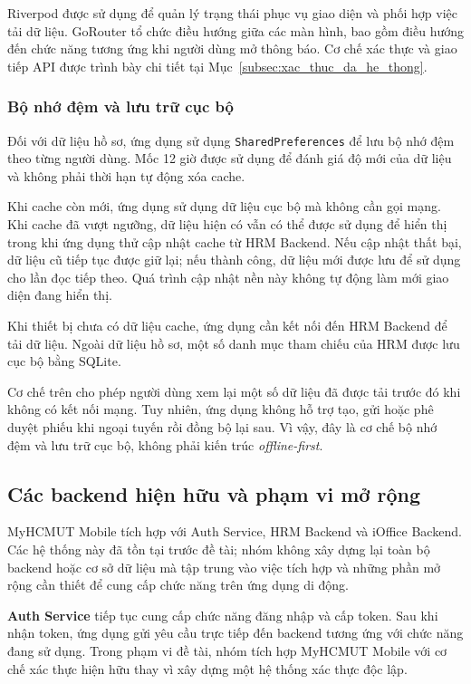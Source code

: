 Riverpod được sử dụng để quản lý trạng thái phục vụ giao diện và phối hợp việc tải dữ liệu. GoRouter tổ chức điều hướng giữa các màn hình, bao gồm điều hướng đến chức năng tương ứng khi người dùng mở thông báo. Cơ chế xác thực và giao tiếp API được trình bày chi tiết tại Mục~\ref{subsec:xac_thuc_da_he_thong}.

\subsubsection*{Bộ nhớ đệm và lưu trữ cục bộ}

Đối với dữ liệu hồ sơ, ứng dụng sử dụng \texttt{SharedPreferences} để lưu bộ nhớ đệm theo từng người dùng. Mốc 12 giờ được sử dụng để đánh giá độ mới của dữ liệu và không phải thời hạn tự động xóa cache.

Khi cache còn mới, ứng dụng sử dụng dữ liệu cục bộ mà không cần gọi mạng. Khi cache đã vượt ngưỡng, dữ liệu hiện có vẫn có thể được sử dụng để hiển thị trong khi ứng dụng thử cập nhật cache từ HRM Backend. Nếu cập nhật thất bại, dữ liệu cũ tiếp tục được giữ lại; nếu thành công, dữ liệu mới được lưu để sử dụng cho lần đọc tiếp theo. Quá trình cập nhật nền này không tự động làm mới giao diện đang hiển thị.

Khi thiết bị chưa có dữ liệu cache, ứng dụng cần kết nối đến HRM Backend để tải dữ liệu. Ngoài dữ liệu hồ sơ, một số danh mục tham chiếu của HRM được lưu cục bộ bằng SQLite.

Cơ chế trên cho phép người dùng xem lại một số dữ liệu đã được tải trước đó khi không có kết nối mạng. Tuy nhiên, ứng dụng không hỗ trợ tạo, gửi hoặc phê duyệt phiếu khi ngoại tuyến rồi đồng bộ lại sau. Vì vậy, đây là cơ chế bộ nhớ đệm và lưu trữ cục bộ, không phải kiến trúc \textit{offline-first}.

\subsection{Các backend hiện hữu và phạm vi mở rộng}
\label{subsec:backend_hien_huu_va_mo_rong}

MyHCMUT Mobile tích hợp với Auth Service, HRM Backend và iOffice Backend. Các hệ thống này đã tồn tại trước đề tài; nhóm không xây dựng lại toàn bộ backend hoặc cơ sở dữ liệu mà tập trung vào việc tích hợp và những phần mở rộng cần thiết để cung cấp chức năng trên ứng dụng di động.

\textbf{Auth Service} tiếp tục cung cấp chức năng đăng nhập và cấp token. Sau khi nhận token, ứng dụng gửi yêu cầu trực tiếp đến backend tương ứng với chức năng đang sử dụng. Trong phạm vi đề tài, nhóm tích hợp MyHCMUT Mobile với cơ chế xác thực hiện hữu thay vì xây dựng một hệ thống xác thực độc lập.

